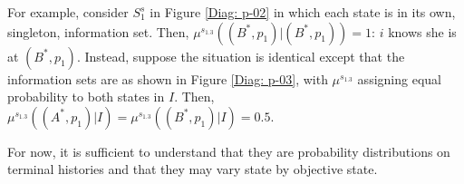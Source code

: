 \documentclass[
11pt,
titlepage,
reqno,
]{article}%
\theoremstyle{definition}
\begin{document}
For example, consider $S^s_1$ in Figure \ref{Diag: p-02} in which each state is in its own, singleton, information set.
Then,  $\mu^{s_{1.3}}((B^\ast,p_1)|(B^\ast,p_1))=1$: $i$ knows she is at $(B^\ast,p_1)$.
Instead, suppose the situation is identical except that the information sets are as shown in Figure \ref{Diag: p-03}, with $\mu^{s_{1.3}}$ assigning equal probability to both states in $I$.
Then, $\mu^{s_{1.3}}((A^\ast,p_1)|I)=\mu^{s_{1.3}}((B^\ast,p_1)|I)=0.5$.

For now, it is sufficient to understand that they are probability distributions on terminal histories and that they may vary state by objective state.

%	
%	
\end{document}
